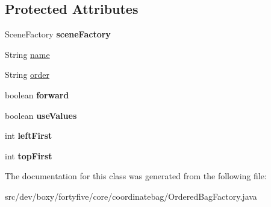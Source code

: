 \subsection*{Protected Attributes}
\begin{DoxyCompactItemize}
\item 
\hypertarget{classdev_1_1boxy_1_1fortyfive_1_1core_1_1coordinatebag_1_1_ordered_bag_factory_a2a577e418ae0fe5923b0c58999efd204}{
SceneFactory {\bfseries sceneFactory}}
\label{df/d76/classdev_1_1boxy_1_1fortyfive_1_1core_1_1coordinatebag_1_1_ordered_bag_factory_a2a577e418ae0fe5923b0c58999efd204}

\item 
String \hyperlink{group___ordered_bag_ga195495c2affffa2242ffdc06ba38ec78}{name}
\item 
String \hyperlink{group___ordered_bag_ga3b0bca31616241e893f2d58440a2f7f7}{order}
\item 
\hypertarget{classdev_1_1boxy_1_1fortyfive_1_1core_1_1coordinatebag_1_1_ordered_bag_factory_ad45b77bb6226c8ec8258f1d0b82af7f3}{
boolean {\bfseries forward}}
\label{df/d76/classdev_1_1boxy_1_1fortyfive_1_1core_1_1coordinatebag_1_1_ordered_bag_factory_ad45b77bb6226c8ec8258f1d0b82af7f3}

\item 
\hypertarget{classdev_1_1boxy_1_1fortyfive_1_1core_1_1coordinatebag_1_1_ordered_bag_factory_ac76517dc390c157d5f128fcd4af4cdd7}{
boolean {\bfseries useValues}}
\label{df/d76/classdev_1_1boxy_1_1fortyfive_1_1core_1_1coordinatebag_1_1_ordered_bag_factory_ac76517dc390c157d5f128fcd4af4cdd7}

\item 
\hypertarget{classdev_1_1boxy_1_1fortyfive_1_1core_1_1coordinatebag_1_1_ordered_bag_factory_a72ae54d39d7f87a7c108a3d254f350bb}{
int {\bfseries leftFirst}}
\label{df/d76/classdev_1_1boxy_1_1fortyfive_1_1core_1_1coordinatebag_1_1_ordered_bag_factory_a72ae54d39d7f87a7c108a3d254f350bb}

\item 
\hypertarget{classdev_1_1boxy_1_1fortyfive_1_1core_1_1coordinatebag_1_1_ordered_bag_factory_a69574a3958ef83291d9a0b73d837289f}{
int {\bfseries topFirst}}
\label{df/d76/classdev_1_1boxy_1_1fortyfive_1_1core_1_1coordinatebag_1_1_ordered_bag_factory_a69574a3958ef83291d9a0b73d837289f}

\end{DoxyCompactItemize}


The documentation for this class was generated from the following file:\begin{DoxyCompactItemize}
\item 
src/dev/boxy/fortyfive/core/coordinatebag/OrderedBagFactory.java\end{DoxyCompactItemize}
